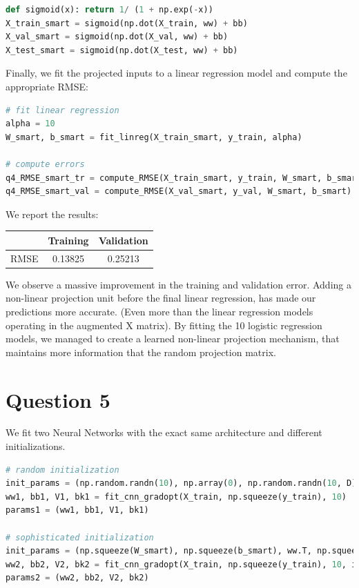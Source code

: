 \documentclass{article}
\begin{document}
\begin{lstlisting}[language=Python]
def sigmoid(x): return 1/ (1 + np.exp(-x))
X_train_smart = sigmoid(np.dot(X_train, ww) + bb)
X_val_smart = sigmoid(np.dot(X_val, ww) + bb)
X_test_smart = sigmoid(np.dot(X_test, ww) + bb)
\end{lstlisting}

Finally, we fit the projected inputs to a linear regression model and compute the appropriate RMSE:

\begin{lstlisting}[language=Python]
# fit linear regression
alpha = 10
W_smart, b_smart = fit_linreg(X_train_smart, y_train, alpha)

# compute errors
q4_RMSE_smart_tr = compute_RMSE(X_train_smart, y_train, W_smart, b_smart)
q4_RMSE_smart_val = compute_RMSE(X_val_smart, y_val, W_smart, b_smart)
\end{lstlisting}

We report the results:

\begin{center}
\begin{tabular}{ | c | c | c | }
\hline
 & Training & Validation \\
\hline
RMSE & 0.13825 & 0.25213 \\ 
\hline
\end{tabular}
\end{center}

We observe a massive improvement in the training and validation error. Adding a non-linear projection unit before the final linear regression, has made our predictions more accurate. (Even more than the linear regression models operating in the augmented X matrix). By fitting the 10 logistic regression models, we managed to create a learned non-linear projection mechanism, that maintains more information that the random projection matrix.

\section*{Question 5}

We fit two Neural Networks with the exact same architecture and different initializations.

\begin{lstlisting}[language=Python]
# random initialization
init_params = (np.random.randn(10), np.array(0), np.random.randn(10, D), np.zeros(10))
ww1, bb1, V1, bk1 = fit_cnn_gradopt(X_train, np.squeeze(y_train), 10)
params1 = (ww1, bb1, V1, bk1)

# sophisticated initialization
init_params = (np.squeeze(W_smart), np.squeeze(b_smart), ww.T, np.squeeze(bb))
ww2, bb2, V2, bk2 = fit_cnn_gradopt(X_train, np.squeeze(y_train), 10, init_params)
params2 = (ww2, bb2, V2, bk2)
\end{lstlisting}
\end{document}
